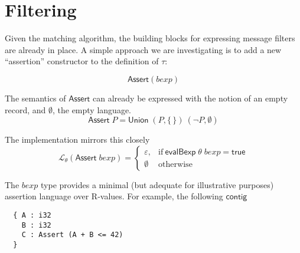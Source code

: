 \documentclass[sigplan,10pt,anonymous,review]{acmart}\settopmatter{printfolios=true,printccs=false,printacmref=false}
\newcommand{\konst}[1]{\ensuremath{\mathsf{#1}}}
\newcommand{\LangTheta}[1]{\ensuremath{{\mathcal L}_{\theta}({#1})}}
\begin{document}

\section{Filtering}

Given the matching algorithm, the building blocks for expressing
message filters are already in place. A simple approach we are
investigating is to add a new ``assertion'' constructor to the
definition of $\tau$:

\[
  \konst{Assert}(\mathit{bexp})
\]

\noindent The semantics of \konst{Assert} can already be expressed
with the notion of an empty record, and $\emptyset$, the empty
language.
\[\konst{Assert}\; P = \konst{Union} \; (P, \{\,\}) \ (\neg P, \emptyset) \]

\noindent The implementation mirrors this closely
\[
\LangTheta{\konst{Assert}\; \mathit{bexp}} =
 \left\{
    \begin{array}{ll}
    \varepsilon, &  \mathrm{if}\ \konst{evalBexp}\;\theta\;\mathit{bexp} = \konst{true} \\
    \emptyset & \mathrm{otherwise}
 \end{array}
 \right.
\]

The $\mathit{bexp}$ type provides a minimal (but adequate for
illustrative purposes) assertion language over R-values. For example,
the following \konst{contig}

\begin{verbatim}
  { A : i32
    B : i32
    C : Assert (A + B <= 42)
  }
\end{verbatim}
\end{document}
